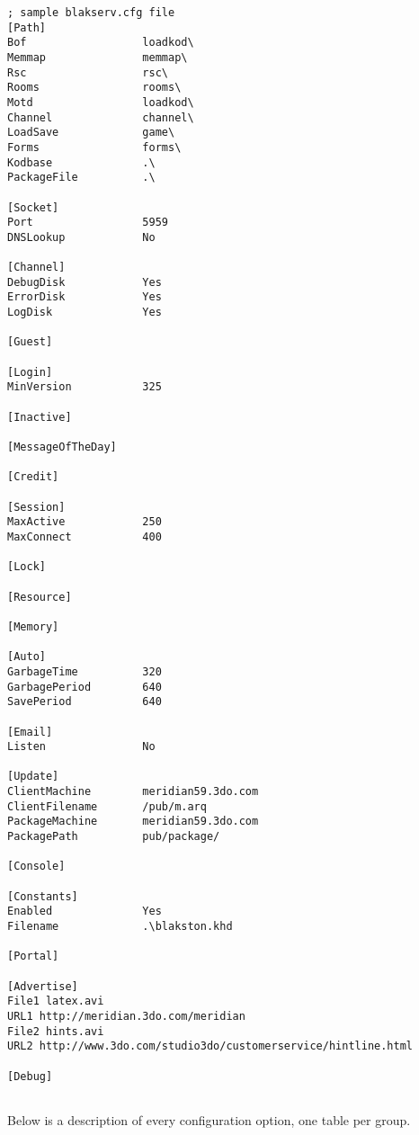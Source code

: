 \begin{verbatim}
; sample blakserv.cfg file
[Path]               
Bof                  loadkod\
Memmap               memmap\
Rsc                  rsc\
Rooms                rooms\
Motd                 loadkod\
Channel              channel\
LoadSave             game\
Forms                forms\
Kodbase              .\
PackageFile          .\

[Socket]             
Port                 5959
DNSLookup            No

[Channel]            
DebugDisk            Yes
ErrorDisk            Yes
LogDisk              Yes

[Guest]              

[Login]              
MinVersion           325

[Inactive]           

[MessageOfTheDay]    

[Credit]             

[Session]            
MaxActive            250
MaxConnect           400

[Lock]               

[Resource]           

[Memory]             

[Auto]               
GarbageTime          320
GarbagePeriod        640
SavePeriod           640

[Email]              
Listen               No

[Update]             
ClientMachine        meridian59.3do.com
ClientFilename       /pub/m.arq
PackageMachine       meridian59.3do.com
PackagePath          pub/package/

[Console]            

[Constants]          
Enabled              Yes
Filename             .\blakston.khd

[Portal]             

[Advertise]          
File1 latex.avi      
URL1 http://meridian.3do.com/meridian
File2 hints.avi
URL2 http://www.3do.com/studio3do/customerservice/hintline.html

[Debug]              


\end{verbatim}

Below is a description of every configuration option, one table per group.

